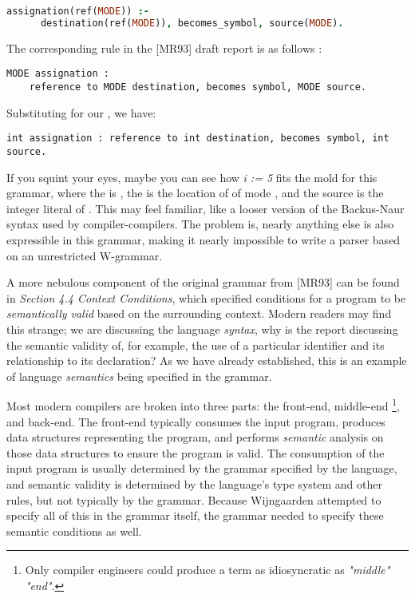 \begin{lstlisting}[language=prolog,frame=single]
assignation(ref(MODE)) :-
      destination(ref(MODE)), becomes_symbol, source(MODE).
\end{lstlisting}

The corresponding rule in the [MR93] draft report is as follows
\cite{draft_report_algol_1968}:
\begin{lstlisting}[frame=single]
MODE assignation :
    reference to MODE destination, becomes symbol, MODE source.
\end{lstlisting}

Substituting  for our , we have:
\begin{lstlisting}[frame=single]
int assignation : reference to int destination, becomes symbol, int source.
\end{lstlisting}

If you squint your eyes, maybe you can see how \textit{i := 5} fits the mold for this
grammar, where the  is , the  is
the location of  of mode , and the source is
the integer literal  of .
This may feel familiar, like a looser version of the Backus-Naur
syntax used by compiler-compilers.
The problem is, nearly anything else is also expressible in this grammar,
making it nearly impossible to write a parser based on an unrestricted W-grammar.

A more nebulous component of the original grammar from [MR93] can be found in
\textit{Section 4.4 Context Conditions},
which specified conditions for a program to be \textit{semantically valid}
based on the surrounding context.
Modern readers may find this strange; we are discussing the language \textit{syntax},
why is the report discussing the semantic validity of, for example,
the use of a particular identifier and its relationship to its declaration?
As we have already established, this is an example of language \textit{semantics}
being specified in the grammar.

Most modern compilers are broken into three parts: the front-end, middle-end
\footnote{Only compiler engineers could produce a term as idiosyncratic as \textit{"middle" "end"}.},
and back-end.
The front-end typically consumes the input program,
produces data structures representing the program,
and performs \textit{semantic} analysis on those data structures to ensure the program is valid.
The consumption of the input program is usually determined by the grammar specified by the language,
and semantic validity is determined by the language's type system and other rules,
but not typically by the grammar.
Because Wijngaarden attempted to specify all of this in the grammar itself,
the grammar needed to specify these semantic conditions as well.

